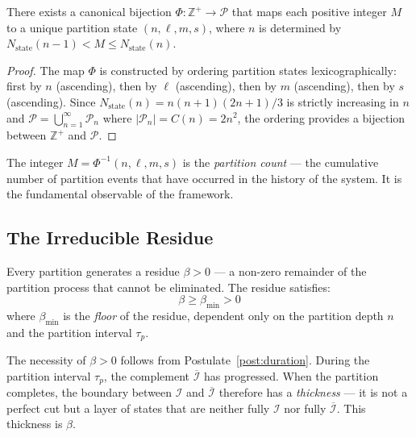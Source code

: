\begin{theorem}
\label{thm:bijection}
There exists a canonical bijection $\Phi: \mathbb{Z}^+ \to \mathcal{P}$ that
maps each positive integer $M$ to a unique partition state $(n,\ell,m,s)$, where
$n$ is determined by $N_{\mathrm{state}}(n-1) < M \leq N_{\mathrm{state}}(n)$.
\end{theorem}

\begin{proof}
The map $\Phi$ is constructed by ordering partition states lexicographically:
first by $n$ (ascending), then by $\ell$ (ascending), then by $m$ (ascending),
then by $s$ (ascending). Since $N_{\mathrm{state}}(n) = n(n+1)(2n+1)/3$ is
strictly increasing in $n$ and $\mathcal{P} = \bigcup_{n=1}^\infty
\mathcal{P}_n$ where $|\mathcal{P}_n| = C(n) = 2n^2$, the ordering provides a
bijection between $\mathbb{Z}^+$ and $\mathcal{P}$.
\end{proof}

The integer $M = \Phi^{-1}(n,\ell,m,s)$ is the \emph{partition count} --- the
cumulative number of partition events that have occurred in the history of the
system. It is the fundamental observable of the framework.

\subsection{The Irreducible Residue}
\label{subsec:residue}

\begin{postulate}
\label{post:floor}
Every partition generates a residue $\beta > 0$ --- a non-zero remainder of the
partition process that cannot be eliminated. The residue satisfies:
\begin{equation}
    \beta \geq \beta_{\min} > 0
    \label{eq:floor}
\end{equation}
where $\beta_{\min}$ is the \emph{floor} of the residue, dependent only on the
partition depth $n$ and the partition interval $\tau_p$.
\end{postulate}

The necessity of $\beta > 0$ follows from Postulate~\ref{post:duration}. During
the partition interval $\tau_p$, the complement $\overline{\mathcal{I}}$ has
progressed. When the partition completes, the boundary between $\mathcal{I}$ and
$\overline{\mathcal{I}}$ therefore has a \emph{thickness} --- it is not a
perfect cut but a layer of states that are neither fully $\mathcal{I}$ nor fully
$\overline{\mathcal{I}}$. This thickness is $\beta$.

